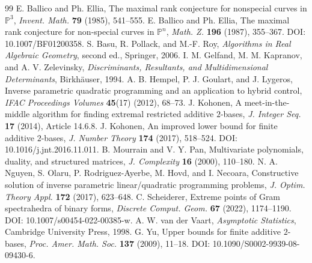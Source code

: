 \documentclass[11pt,reqno]{amsart}
\numberwithin{equation}{section}
\theoremstyle{definition}\newtheorem{definition}[theorem]{Definition}
\theoremstyle{remark}\newtheorem{remark}[theorem]{Remark}
\newcommand{\Pj}{\mathbb P}
\begin{document}
\begin{thebibliography}{99}
 E. Ballico and Ph. Ellia, The maximal rank conjecture for nonspecial curves in $\Pj^3$, \emph{Invent. Math.} \textbf{79} (1985), 541--555.
 E. Ballico and Ph. Ellia, The maximal rank conjecture for non-special curves in $\Pj^n$, \emph{Math. Z.} \textbf{196} (1987), 355--367. DOI: 10.1007/BF01200358.
 S. Basu, R. Pollack, and M.-F. Roy, \emph{Algorithms in Real Algebraic Geometry}, second ed., Springer, 2006.
 I. M. Gelfand, M. M. Kapranov, and A. V. Zelevinsky, \emph{Discriminants, Resultants, and Multidimensional Determinants}, Birkh\"auser, 1994.
 A. B. Hempel, P. J. Goulart, and J. Lygeros, Inverse parametric quadratic programming and an application to hybrid control, \emph{IFAC Proceedings Volumes} \textbf{45}(17) (2012), 68--73.
 J. Kohonen, A meet-in-the-middle algorithm for finding extremal restricted additive $2$-bases, \emph{J. Integer Seq.} \textbf{17} (2014), Article 14.6.8.
 J. Kohonen, An improved lower bound for finite additive $2$-bases, \emph{J. Number Theory} \textbf{174} (2017), 518--524. DOI: 10.1016/j.jnt.2016.11.011.
 B. Mourrain and V. Y. Pan, Multivariate polynomials, duality, and structured matrices, \emph{J. Complexity} \textbf{16} (2000), 110--180.
 N. A. Nguyen, S. Olaru, P. Rodriguez-Ayerbe, M. Hovd, and I. Necoara, Constructive solution of inverse parametric linear/quadratic programming problems, \emph{J. Optim. Theory Appl.} \textbf{172} (2017), 623--648.
 C. Scheiderer, Extreme points of Gram spectrahedra of binary forms, \emph{Discrete Comput. Geom.} \textbf{67} (2022), 1174--1190. DOI: 10.1007/s00454-022-00385-w.
 A. W. van der Vaart, \emph{Asymptotic Statistics}, Cambridge University Press, 1998.
 G. Yu, Upper bounds for finite additive $2$-bases, \emph{Proc. Amer. Math. Soc.} \textbf{137} (2009), 11--18. DOI: 10.1090/S0002-9939-08-09430-6.
\end{thebibliography}
\end{document}
